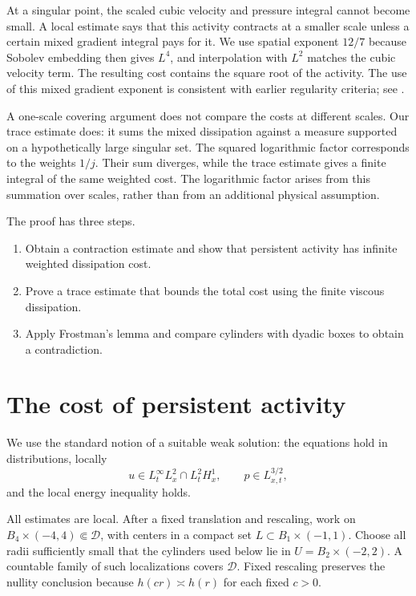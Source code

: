 \documentclass[11pt]{article}
\begin{document}
At a singular point, the scaled cubic velocity and pressure integral
cannot become small. A local estimate says that this activity contracts
at a smaller scale unless a certain mixed gradient integral pays for
it. We use spatial exponent \(12/7\) because Sobolev embedding then
gives \(L^4\), and interpolation with \(L^2\) matches the cubic velocity
term. The resulting cost contains the square root of the activity.
The use of this mixed gradient exponent is consistent with earlier
regularity criteria; see \cite{GKT}.

A one-scale covering argument does not compare the costs at different
scales. Our trace estimate does: it sums the mixed dissipation against
a measure supported on a hypothetically large singular set. The squared
logarithmic factor corresponds to the weights \(1/j\). Their
sum diverges, while the trace estimate gives a finite integral of the
same weighted cost. The logarithmic factor arises from this summation over
scales, rather than from an additional physical assumption.

The proof has three steps.
\begin{enumerate}
\item Obtain a contraction estimate and show that persistent activity
has infinite weighted dissipation cost.
\item Prove a trace estimate that bounds the total cost using the
finite viscous dissipation.
\item Apply Frostman's lemma and compare cylinders with dyadic boxes
 to obtain a contradiction.
\end{enumerate}

\section{The cost of persistent activity}

We use the standard notion of a suitable weak solution: the equations
hold in distributions, locally
$$
u\in L^\infty_tL^2_x\cap L^2_tH^1_x,
\qquad p\in L^{3/2}_{x,t},
$$
and the local energy inequality holds.

All estimates are local. After a fixed translation and rescaling,
work on \(B_4\times(-4,4)\Subset\mathcal D\), with centers in a compact
set \(L\subset B_1\times(-1,1)\). Choose all radii sufficiently small
that the cylinders used below lie in \(U=B_2\times(-2,2)\).
A countable family of such localizations covers \(\mathcal D\).
Fixed rescaling preserves the nullity conclusion because
\(h(cr)\asymp h(r)\) for each fixed \(c>0\).
\end{document}
